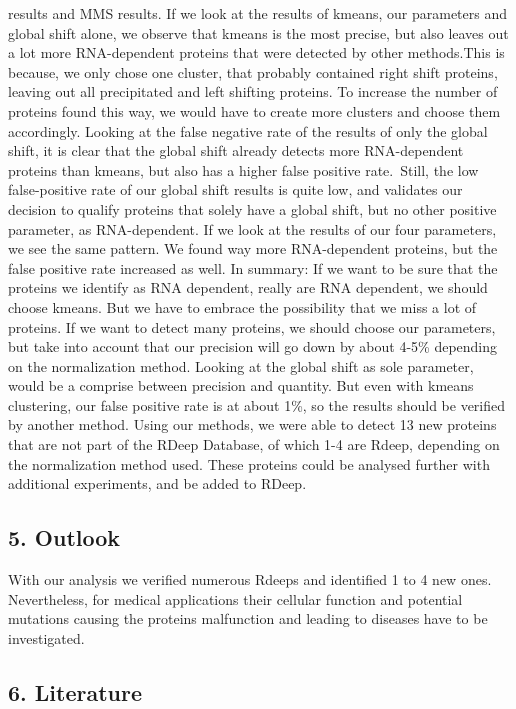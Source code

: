 \documentclass[
  12pt,
]{article}
\begin{document}
results and MMS results. If we look at the results of kmeans, our
parameters and global shift alone, we observe that kmeans is the most
precise, but also leaves out a lot more RNA-dependent proteins that were
detected by other methods.This is because, we only chose one cluster,
that probably contained right shift proteins, leaving out all
precipitated and left shifting proteins. To increase the number of
proteins found this way, we would have to create more clusters and
choose them accordingly. Looking at the false negative rate of the
results of only the global shift, it is clear that the global shift
already detects more RNA-dependent proteins than kmeans, but also has a
higher false positive rate.~Still, the low false-positive rate of our
global shift results is quite low, and validates our decision to qualify
proteins that solely have a global shift, but no other positive
parameter, as RNA-dependent. If we look at the results of our four
parameters, we see the same pattern. We found way more RNA-dependent
proteins, but the false positive rate increased as well. In summary: If
we want to be sure that the proteins we identify as RNA dependent,
really are RNA dependent, we should choose kmeans. But we have to
embrace the possibility that we miss a lot of proteins. If we want to
detect many proteins, we should choose our parameters, but take into
account that our precision will go down by about 4-5\% depending on the
normalization method. Looking at the global shift as sole parameter,
would be a comprise between precision and quantity. But even with kmeans
clustering, our false positive rate is at about 1\%, so the results
should be verified by another method. Using our methods, we were able to
detect 13 new proteins that are not part of the RDeep Database, of which
1-4 are Rdeep, depending on the normalization method used. These
proteins could be analysed further with additional experiments, and be
added to RDeep.

\hypertarget{outlook}{%
\subsection{5. Outlook}\label{outlook}}

With our analysis we verified numerous Rdeeps and identified 1 to 4 new
ones. Nevertheless, for medical applications their cellular function and
potential mutations causing the proteins malfunction and leading to
diseases have to be investigated.

\hypertarget{literature}{%
\subsection{6. Literature}\label{literature}}
\end{document}

